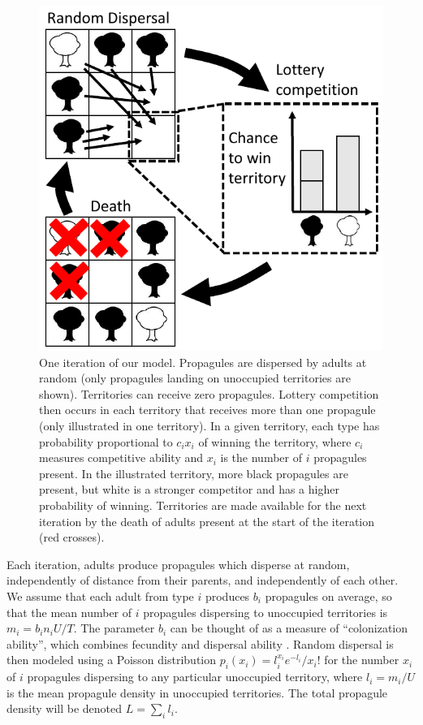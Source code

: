 \documentclass[12pt]{article}
\begin{document}
\begin{figure}
\centering
\includegraphics[scale=0.8]{lottery.pdf}
\caption{\label{fig:lottery} One iteration of our model. Propagules are dispersed by adults at random (only propagules landing on unoccupied territories are shown). Territories can receive zero propagules. Lottery competition then occurs in each territory that receives more than one propagule (only illustrated in one territory). In a given territory, each type has probability proportional to $c_i x_i$ of winning the territory, where $c_i$ measures competitive ability and $x_i$ is the number of $i$ propagules present. In the illustrated territory, more black propagules are present, but white is a stronger competitor and has a higher probability of winning. Territories are made available for the next iteration by the death of adults present at the start of the iteration (red crosses).}
\end{figure}

Each iteration, adults produce propagules which disperse at random, independently of distance from their parents, and independently of each other. We assume that each adult from type $i$ produces $b_i$ propagules on average, so that the mean number of $i$ propagules dispersing to unoccupied territories is $m_i=b_in_iU/T$. The parameter $b_i$ can be thought of as a measure of ``colonization ability'', which combines fecundity and dispersal ability \citep{levins_71,tilman_94}. Random dispersal is then modeled using a Poisson distribution $p_i(x_i)=l_i^{x_i} e^{-l_i}/x_i!$ for the number $x_i$ of $i$ propagules dispersing to any particular unoccupied territory, where $l_i=m_i/U$ is the mean propagule density in unoccupied territories. The total propagule density will be denoted $L=\sum_i l_i$.
\end{document}

